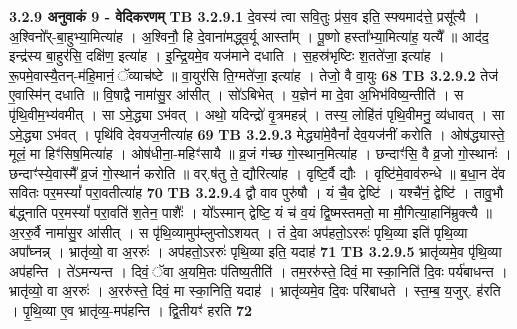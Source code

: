 \documentclass[17pt]{extarticle}
\begin{document}
{{{{{{{{{{{{{{{{{{{                \textbf{ 3.2.9     अनुवाकं   9 - वेदिकरणम्} \newline
                                \textbf{ TB 3.2.9.1} \newline
                  दे॒वस्य॑ त्वा सवि॒तुः प्र॑स॒व इति॒ स्फ्यमाद॑त्ते॒ प्रसू᳚त्यै । अ॒श्विनो᳚र्-बा॒हुभ्या॒मित्या॑ह । अ॒श्विनौ॒ हि दे॒वाना॑मद्ध्व॒र्यू आस्ता᳚म् । पू॒ष्णो हस्ता᳚भ्या॒मित्या॑ह॒ यत्यै᳚ ॥ आद॑द॒ इन्द्र॑स्य बा॒हुर॑सि॒ दक्षि॑ण॒ इत्या॑ह । इ॒न्द्रि॒यमे॒व यज॑माने दधाति । स॒हस्र॑भृष्टिः श॒तते॑जा॒ इत्या॑ह । रू॒पमे॒वास्यै॒तन्-म॑हि॒मानं॒ ॅव्याच॑ष्टे ॥ वा॒युर॑सि ति॒ग्मते॑जा॒ इत्या॑ह । तेजो॒ वै वा॒युः \textbf{ 68} \newline
                  \newline
                                \textbf{ TB 3.2.9.2} \newline
                  तेज॑ ए॒वास्मि॑न् दधाति ॥ वि॒षाद्वै नामा॑सु॒र आ॑सीत् । सो॑ऽबिभेत् । य॒ज्ञेन॑ मा दे॒वा अ॒भिभ॑विष्य॒न्तीति॑ । स पृ॑थि॒वीम॒भ्य॑वमीत् । सा ऽमे॒द्ध्या ऽभ॑वत् । अथो॒ यदिन्द्रो॑ वृ॒त्रमहन्न्॑ । तस्य॒ लोहि॑तं पृथि॒वीमनु॒ व्य॑धावत् । सा ऽमे॒द्ध्या ऽभ॑वत् । पृथि॑वि देवयज॒नीत्या॑ह \textbf{ 69} \newline
                  \newline
                                \textbf{ TB 3.2.9.3} \newline
                  मेद्ध्या॑मे॒वैनां᳚ देव॒यज॑नीं करोति । ओष॑द्ध्यास्ते॒ मूलं॒ मा हिꣳ॑सिष॒मित्या॑ह । ओष॑धीना॒-महिꣳ॑सायै ॥ व्र॒जं ग॑च्छ गो॒स्थान॒मित्या॑ह । छन्दाꣳ॑सि॒ वै व्र॒जो गो॒स्थानः॑ । छन्दाꣳ॑स्ये॒वास्मै᳚ व्र॒जं गो॒स्थानं॑ करोति ॥ वर्.ष॑तु ते॒ द्यौरित्या॑ह । वृष्टि॒र्वै द्यौः । वृष्टि॑मे॒वाव॑रुन्धे ॥ ब॒धा॒न दे॑व सवितः पर॒मस्यां᳚ परा॒वतीत्या॑ह \textbf{ 70} \newline
                  \newline
                                \textbf{ TB 3.2.9.4} \newline
                  द्वौ वाव पुरु॑षौ । यं चै॒व द्वेष्टि॑ । यश्चै॑नं॒ द्वेष्टि॑ । तावु॒भौ ब॑द्ध्नाति पर॒मस्यां᳚ परा॒वति॑ श॒तेन॒ पाशैः᳚ । यो᳚ऽस्मान् द्वेष्टि॒ यं च॑ व॒यं द्वि॒ष्मस्तमतो॒ मा मौ॒गित्या॒हानि॑म्रुक्त्यै ॥ अ॒ररु॒र्वै नामा॑सु॒र आ॑सीत् । स पृ॑थि॒व्यामुप॑म्लुप्तोऽशयत् । तं दे॒वा अप॑हतो॒ऽररुः॑ पृथि॒व्या इति॑ पृथि॒व्या अपा᳚घ्नन्न् । भ्रातृ॑व्यो॒ वा अ॒ररुः॑ । अप॑हतो॒ऽररुः॑ पृथि॒व्या इति॒ यदाह॑ \textbf{ 71} \newline
                  \newline
                                \textbf{ TB 3.2.9.5} \newline
                  भ्रातृ॑व्यमे॒व पृ॑थि॒व्या अप॑हन्ति । ते॑ऽमन्यन्त । दिवं॒ ॅवा अ॒यमि॒तः प॑तिष्य॒तीति॑ । तम॒ररु॑स्ते॒ दिवं॒ मा स्का॒निति॑ दि॒वः पर्य॑बाधन्त । भ्रातृ॑व्यो॒ वा अ॒ररुः॑ । अ॒ररु॑स्ते॒ दिवं॒ मा स्का॒निति॒ यदाह॑ । भ्रातृ॑व्यमे॒व दि॒वः परि॑बाधते । स्त॒म्ब॒ य॒जुर्. ह॑रति । पृ॒थि॒व्या ए॒व भ्रातृ॑व्य॒-मप॑हन्ति । द्वि॒तीयꣳ॑ हरति \textbf{ 72} \newline
}}}}}}}}}}}}}}}}}}}
\end{document}
